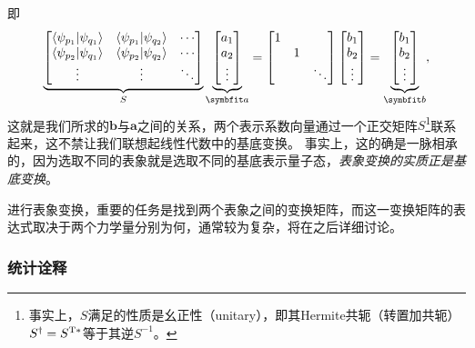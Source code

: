 即
\begin{equation}
    \underbrace{
    \begin{bmatrix}
        \braket{\psi_{p_1}}{\psi_{q_1}} & \braket{\psi_{p_1}}{\psi_{q_2}} & \cdots \\
        \braket{\psi_{p_2}}{\psi_{q_1}} & \braket{\psi_{p_2}}{\psi_{q_2}} & \cdots \\
        \vdots & \vdots & \ddots
    \end{bmatrix}}_{S}
    \underbrace{\begin{bmatrix}
        a_1 \\ a_2 \\ \vdots
    \end{bmatrix}}_{\bm{a}}
    =
    \begin{bmatrix}
        1 \\ & 1 \\ & & \ddots
    \end{bmatrix}
    \begin{bmatrix}
        b_1 \\ b_2 \\ \vdots
    \end{bmatrix}
    =
    \underbrace{\begin{bmatrix}
        b_1 \\ b_2 \\ \vdots
    \end{bmatrix}}_{\bm{b}},
\end{equation}
这就是我们所求的$\bm{b}$与$\bm{a}$之间的关系，两个表示系数向量通过一个正交矩阵$S$\footnote{事实上，$S$满足的性质是幺正性（unitary），即其Hermite共轭（转置加共轭）$S^{\dagger}=S^{\rm{T}*}$等于其逆$S^{-1}$。}联系起来，这不禁让我们联想起线性代数中的基底变换。
事实上，这的确是一脉相承的，因为选取不同的表象就是选取不同的基底表示量子态，\emph{表象变换的实质正是基底变换}。

进行表象变换，重要的任务是找到两个表象之间的变换矩阵，而这一变换矩阵的表达式取决于两个力学量分别为何，通常较为复杂，将在之后详细讨论。


\subsubsection{统计诠释}

